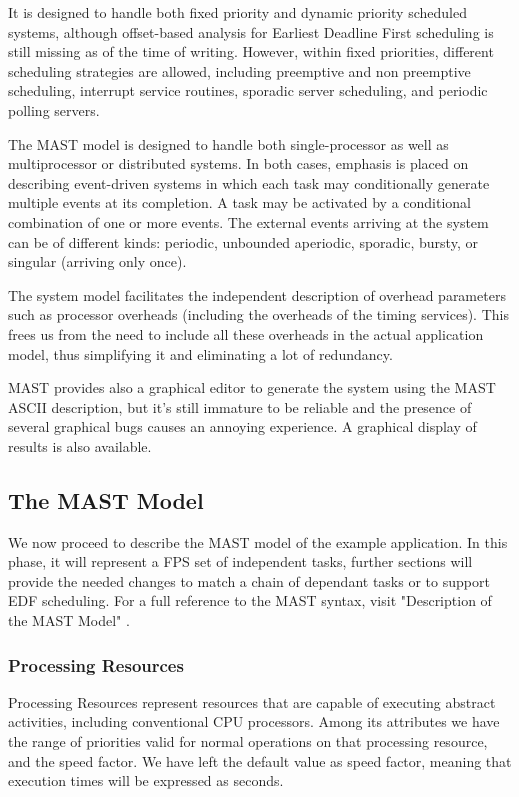 \documentclass{article}
\begin{document}
It is designed to handle both fixed priority and dynamic priority scheduled systems, although offset-based analysis for Earliest Deadline First scheduling is still missing as of the time of writing. However, within fixed priorities, different scheduling strategies are allowed, including preemptive and non preemptive scheduling, interrupt service routines, sporadic server scheduling, and periodic polling servers.

The MAST model is designed to handle both single-processor as well as multiprocessor or distributed systems. In both cases, emphasis is placed on describing event-driven systems in which each task may conditionally generate multiple events at its completion. A task may be activated by a conditional combination of one or more events. The external events arriving at the system can be of different kinds: periodic, unbounded aperiodic, sporadic, bursty, or singular (arriving only once).

The system model facilitates the independent description of overhead parameters such as processor overheads (including the overheads of the timing services). This frees us from the need to include all these overheads in the actual application model, thus simplifying it and eliminating a lot of redundancy.

MAST provides also a graphical editor to generate the system using the MAST ASCII description, but it's still immature to be reliable and the presence of several graphical bugs causes an annoying experience. A graphical display of results is also available.

\subsection{The MAST Model}

We now proceed to describe the MAST model of the example application. In this phase, it will represent a FPS set of independent tasks, further sections will provide the needed changes to match a chain of dependant tasks or to support EDF scheduling. For a full reference to the MAST syntax, visit "Description of the MAST Model" \cite{mast-description}.

\subsubsection{Processing Resources}

Processing Resources represent resources that are capable of executing abstract activities, including conventional CPU processors. Among its attributes we have the range of priorities valid for normal operations on that processing resource, and the speed factor. We have left the default value as speed factor, meaning that execution times will be expressed as seconds.
\end{document}
